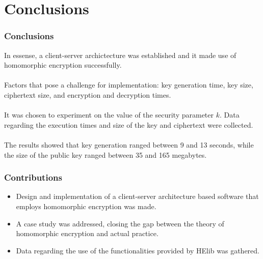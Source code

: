 \documentclass{beamer}
\begin{document}
\begin{frame}
\begin{table}[]
\centering
{}
\end{table}
\end{frame}

\section{Conclusions}
\begin{frame}
\frametitle{Conclusions}

In essense, a client-server archictecture was established and it made use of homomorphic encryption successfully. \\~\\

Factors that pose a challenge for implementation: key generation time, key size, ciphertext size, and encryption and decryption times. \\~\\

It was chosen to experiment on the value of the security parameter $k$. Data regarding the execution times and size of the key and ciphertext were collected. \\~\\

The results showed that key generation ranged between 9 and 13 seconds, while the size of the public key ranged between 35 and 165 megabytes.
\end{frame}
\begin{frame}
\frametitle{Contributions}
\begin{itemize}
  \setlength\itemsep{1.5em}
\item Design and implementation of a client-server architecture based software that employs homomorphic encryption was made.
\item A case study was addressed, closing the gap between the theory of homomorphic encryption and actual practice.
\item Data regarding the use of the functionalities provided by HElib was gathered.
\end{itemize}
\end{frame}
\end{document}
